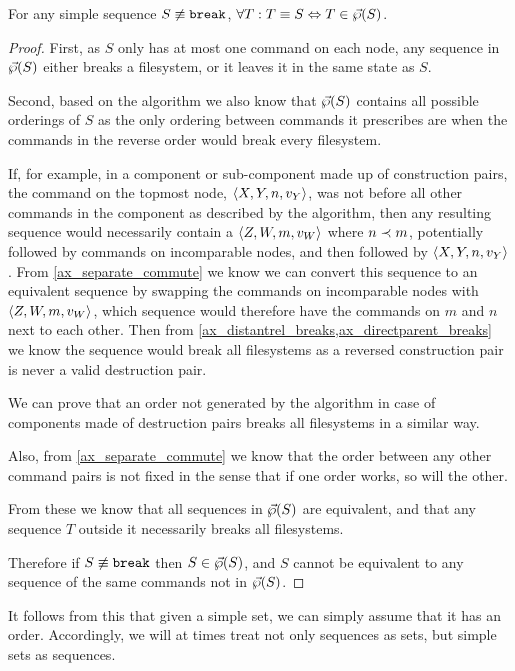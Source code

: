 \begin{mylem}\label{simple_reorder_equiv}
For any simple sequence $S\not\equiv\mathtt{break}$,
$\forall T: T\equiv S \Leftrightarrow T\in\vec{\wp}({S})$.
\end{mylem}
\begin{proof}
First, as $S$ only has at most one command on each node,
any sequence in $\vec{\wp}({S})$ either breaks a filesystem,
or it leaves it in the same state as $S$.

Second, based on the algorithm we also know that $\vec{\wp}({S})$ contains
all possible orderings of $S$ as the only ordering between commands
it prescribes are when the commands in the reverse order would break every filesystem.

If, for example, in a component or sub-component
made up of construction pairs,
the command on the topmost node, $\langle{X,Y,n,v_Y}\rangle$, was not before all other commands
in the component as described by the algorithm,
then any resulting sequence would necessarily contain
a $\langle{Z,W,m,v_W}\rangle$ where $n\prec m$, potentially followed by commands
on incomparable nodes, and then followed by $\langle{X,Y,n,v_Y}\rangle$.
From \cref{ax_separate_commute} we know we can convert this sequence
to an equivalent sequence by swapping the commands on incomparable nodes with
$\langle{Z,W,m,v_W}\rangle$, which sequence would therefore have the commands on
$m$ and $n$ next to each other. Then from \cref{ax_distantrel_breaks,ax_directparent_breaks}
we know the sequence would break all filesystems
as a reversed construction pair is never a valid destruction pair.

We can prove that an order not generated by the algorithm
in case of components made of destruction pairs breaks all filesystems
in a similar way.

Also, from \cref{ax_separate_commute} we know
that the order between any other command pairs is not fixed in the sense
that if one order works, so will the other.

From these we know that all sequences in $\vec{\wp}({S})$
are equivalent, and that any sequence $T$ outside it
necessarily breaks all filesystems.

Therefore if $S\not\equiv\mathtt{break}$ then $S\in\vec{\wp}({S})$,
and $S$ cannot be equivalent to any sequence of the same commands
not in $\vec{\wp}({S})$.
\end{proof}

It follows from this that given a simple set,
we can simply assume that it has an order.
Accordingly, we will at times treat not only sequences as sets,
but simple sets as sequences.

